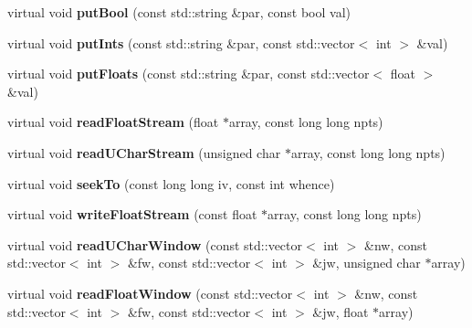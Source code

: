 \begin{DoxyCompactItemize}
virtual void {\bfseries put\+Bool} (const std\+::string \&par, const bool val)
\item 
\mbox{\label{class_s_e_p_1_1json_generic_file_af7c0733053e4ed49a046e807f6a60bfe}} 
virtual void {\bfseries put\+Ints} (const std\+::string \&par, const std\+::vector$<$ int $>$ \&val)
\item 
\mbox{\label{class_s_e_p_1_1json_generic_file_ad3ef1adc567464f97ddf84e713b7054c}} 
virtual void {\bfseries put\+Floats} (const std\+::string \&par, const std\+::vector$<$ float $>$ \&val)
\item 
\mbox{\label{class_s_e_p_1_1json_generic_file_a2f23e630601b7202f8b5fc7881d6133c}} 
virtual void {\bfseries read\+Float\+Stream} (float $\ast$array, const long long npts)
\item 
\mbox{\label{class_s_e_p_1_1json_generic_file_a471fa2203c86dc79eac66229ab5a21d3}} 
virtual void {\bfseries read\+U\+Char\+Stream} (unsigned char $\ast$array, const long long npts)
\item 
\mbox{\label{class_s_e_p_1_1json_generic_file_aca41ec23fbe6a581566b1c14781071c4}} 
virtual void {\bfseries seek\+To} (const long long iv, const int whence)
\item 
\mbox{\label{class_s_e_p_1_1json_generic_file_a5200d33399447d24c96227fc8c4cdfa8}} 
virtual void {\bfseries write\+Float\+Stream} (const float $\ast$array, const long long npts)
\item 
\mbox{\label{class_s_e_p_1_1json_generic_file_a1b0699c175f342fb77d738e2d9abd562}} 
virtual void {\bfseries read\+U\+Char\+Window} (const std\+::vector$<$ int $>$ \&nw, const std\+::vector$<$ int $>$ \&fw, const std\+::vector$<$ int $>$ \&jw, unsigned char $\ast$array)
\item 
\mbox{\label{class_s_e_p_1_1json_generic_file_a9e6894c3e4a085e83510cee77b32b9e0}} 
virtual void {\bfseries read\+Float\+Window} (const std\+::vector$<$ int $>$ \&nw, const std\+::vector$<$ int $>$ \&fw, const std\+::vector$<$ int $>$ \&jw, float $\ast$array)

\end{DoxyCompactItemize}
